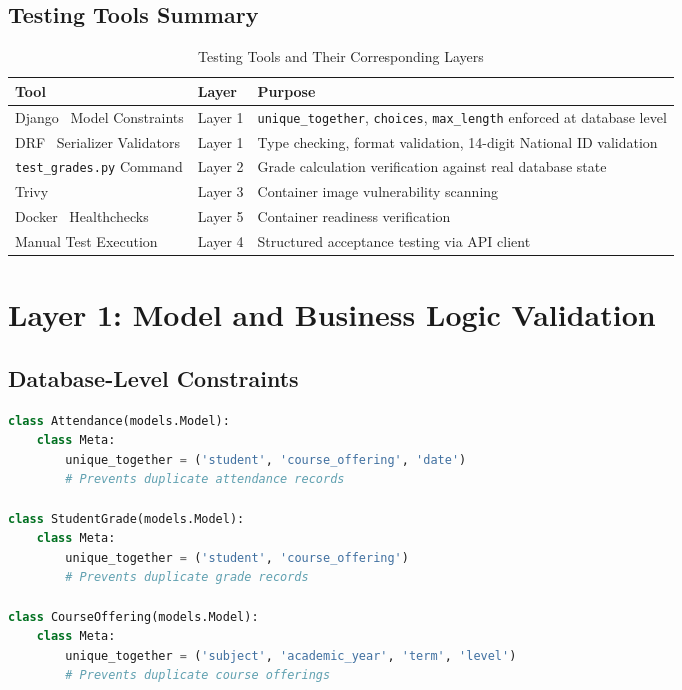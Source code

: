 \subsection{Testing Tools Summary}

\begin{table}[H]
    \centering
    \renewcommand{\arraystretch}{1.3}
    \begin{tabular}{|l|l|p{8cm}|}
        \hline
        \textbf{Tool} & \textbf{Layer} & \textbf{Purpose} \\
        \hline
        Django~\cite{django} Model Constraints & Layer 1 & \texttt{unique\_together}, \texttt{choices}, \texttt{max\_length} enforced at database level \\
        \hline
        DRF~\cite{djangorest} Serializer Validators & Layer 1 & Type checking, format validation, 14-digit National ID validation \\
        \hline
        \texttt{test\_grades.py} Command & Layer 2 & Grade calculation verification against real database state \\
        \hline
        Trivy~\cite{trivy} & Layer 3 & Container image vulnerability scanning \\
        \hline
        Docker~\cite{docker} Healthchecks & Layer 5 & Container readiness verification \\
        \hline
        Manual Test Execution & Layer 4 & Structured acceptance testing via API client \\
        \hline
    \end{tabular}
    \caption{Testing Tools and Their Corresponding Layers}
    \label{tab:testing_tools}
\end{table}

\section{Layer 1: Model and Business Logic Validation}
\label{sec:layer1-validation}

\subsection{Database-Level Constraints}

\begin{lstlisting}[language=Python, caption=Critical Uniqueness Constraints (academic/models.py)]
class Attendance(models.Model):
    class Meta:
        unique_together = ('student', 'course_offering', 'date')
        # Prevents duplicate attendance records

class StudentGrade(models.Model):
    class Meta:
        unique_together = ('student', 'course_offering')
        # Prevents duplicate grade records

class CourseOffering(models.Model):
    class Meta:
        unique_together = ('subject', 'academic_year', 'term', 'level')
        # Prevents duplicate course offerings
\end{lstlisting}

